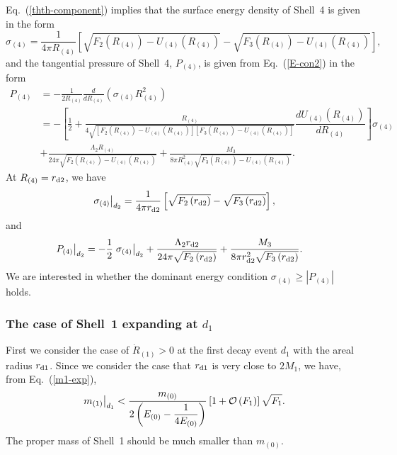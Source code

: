 \documentclass[aps,preprint,preprintnumber,nofootinbib,amsmath,amssymb,ascmac,bm,12pt]{revtex4}
\newcommand{\rdo}{r_{\rm d1}}
\newcommand{\rdt}{r_{\rm d2}}
\newcommand{\mz}{m_{(0)}}
\newcommand{\mo}{m_{(1)}}
\newcommand{\Ron}{R_{(1)}}
\newcommand{\Rfo}{R_{(4)}}
\newcommand{\Uon}{U_{(1)}}
\newcommand{\Ufo}{U_{(4)}}
\newcommand{\Eze}{E_{(0)}}
\begin{document}
Eq.~(\ref{thth-component}) implies that the surface energy density of Shell~4 is given in the form  
\begin{equation}
\sigma_{(4)}
=\frac{1}{4\pi\Rfo}\left[\sqrt{F_2\left(\Rfo\right)-\Ufo\left(\Rfo\right)}
-\sqrt{F_3\left(\Rfo\right)-\Ufo\left(\Rfo\right)}\right], \label{sigma4}
\end{equation}
and the tangential pressure of Shell~4, $P_{(4)}$, is given from Eq.~(\ref{E-con2}) in the form
\begin{align}
P_{(4)}&=-\frac{1}{2\Rfo}\frac{d}{d\Rfo}\left(\sigma_{(4)}\Rfo^2\right) \nonumber \\
&=-\left[\frac{1}{2}+\frac{\Rfo}
{4\sqrt{\left[F_2\left(\Rfo\right)-\Ufo\left(\Rfo\right)\right]\left[F_3\left(\Rfo\right)-\Ufo\left(\Rfo\right)\right]}}
\dfrac{d\Ufo\left(\Rfo\right)}{d\Rfo}\right]\sigma_{(4)} \nonumber \\
&+\frac{\Lambda_2\Rfo}{24\pi\sqrt{F_2\left(\Rfo\right)-\Ufo\left(\Rfo\right)}}
+\frac{M_3}{8\pi\Rfo^2\sqrt{F_3\left(\Rfo\right)-\Ufo\left(\Rfo\right)}}.
\label{P4}
\end{align}
At $\Rfo=\rdt$, we have
\begin{equation}
\left.\sigma_{(4)}\right|_{d_2}
=\frac{1}{4\pi\rdt}\left[\sqrt{F_2\left(\rdt\right)}-\sqrt{F_3\left(\rdt\right)}\right], \label{sigma-asym}
\end{equation}
and
\begin{align}
\left.P_{(4)}\right|_{d_2}&=-\frac{1}{2}\left.\sigma_{(4)}\right|_{d_2} 
+\frac{\Lambda_2\rdt}{24\pi\sqrt{F_2\left(\rdt\right)}}
+\frac{M_3}{8\pi\rdt^2\sqrt{F_3\left(\rdt\right)}}. \label{P-asym}
\end{align}
We are interested in whether the dominant energy condition 
$\sigma_{(4)}\geq\left|P_{(4)}\right|$ holds.

\subsubsection{The case of Shell~1 expanding at $d_1$}

First we consider the case of $\dot{R}_{(1)}>0$ at the first decay event $d_1$ with the areal radius $\rdo$. 
Since we consider the case that $\rdo$ is very close to $2M_1$, we have, from Eq.~(\ref{m1-exp}), 
\begin{equation}
\left.\mo\right|_{d_1}<\frac{\mz}{2\left(\Eze-\dfrac{1}{4\Eze}\right)}\left[1+{\cal O}\left(F_1\right)\right]\sqrt{F_1}. 
\label{m1-exp-2}
\end{equation}
The proper mass of Shell~1 should be much smaller than $\mz$. 
\end{document}
